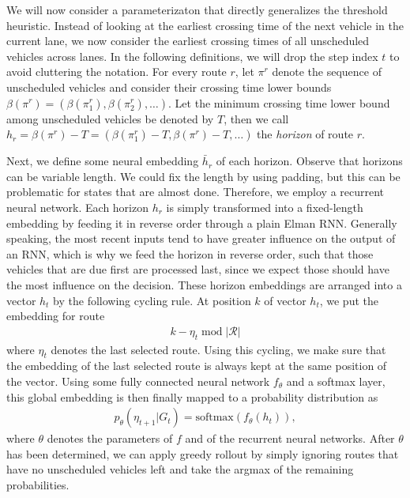 \documentclass[a4paper]{article}
\theoremstyle{definition}
\theoremstyle{plain}
\begin{document}
We will now consider a parameterizaton that directly generalizes the
threshold heuristic. Instead of looking at the earliest crossing time of the
next vehicle in the current lane, we now consider the earliest crossing
times of all unscheduled vehicles across lanes.
%
In the following definitions, we will drop the step index $t$ to avoid
cluttering the notation.
%
For every route $r$, let $\pi^{r}$ denote the sequence of unscheduled vehicles
and consider their crossing time lower bounds
$\beta(\pi^{r}) = (\beta(\pi^{r}_{1}), \beta(\pi^{r}_{2}), \dots)$. Let the
minimum crossing time lower bound among unscheduled vehicles be denoted by $T$,
then we call
$h_{r} = \beta(\pi^{r}) - T = (\beta(\pi^{r}_{1}) - T, \beta(\pi^{r}) - T, \dots)$
the \textit{horizon} of route $r$.

Next, we define some neural embedding $\bar{h}_{r}$ of each horizon. Observe
that horizons can be variable length. We could fix the length by using padding,
but this can be problematic for states that are almost done. Therefore, we
employ a recurrent neural network. Each horizon $h_r$ is simply transformed into
a fixed-length embedding by feeding it in reverse order through a plain Elman
RNN. Generally speaking, the most recent inputs tend to have greater influence
on the output of an RNN, which is why we feed the horizon in reverse order, such
that those vehicles that are due first are processed last, since we expect those
should have the most influence on the decision. These horizon embeddings are
arranged into a vector $h_{t}$ by the following cycling rule. At position $k$ of
vector $h_{t}$, we put the embedding for route
\begin{align*}
  k - \eta_{t} \; \mathrm{mod} \; |\mathcal{R}|
\end{align*}
where $\eta_{t}$ denotes the last selected route. Using this cycling, we make sure
that the embedding of the last selected route is always kept at the same
position of the vector.
%
Using some fully connected neural network $f_{\theta}$ and a softmax layer, this
global embedding is then finally mapped to a probability distribution as
\begin{align*}
  p_{\theta}(\eta_{t+1} | G_{t}) = \text{softmax} ( f_{\theta}(h_{t})) ,
\end{align*}
where $\theta$ denotes the parameters of $f$ and of the recurrent neural
networks.
After $\theta$ has been determined, we can apply greedy rollout by simply
ignoring routes that have no unscheduled vehicles left and take the argmax of
the remaining probabilities.
\end{document}
